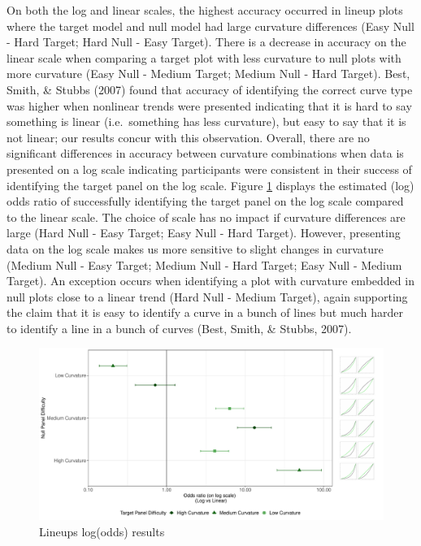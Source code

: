 \documentclass[print]{nuthesis}
\begin{document}
On both the log and linear scales, the highest accuracy occurred in lineup plots where the target model and null model had large curvature differences (Easy Null - Hard Target; Hard Null - Easy Target).
There is a decrease in accuracy on the linear scale when comparing a target plot with less curvature to null plots with more curvature (Easy Null - Medium Target; Medium Null - Hard Target).
Best, Smith, \& Stubbs (2007) found that accuracy of identifying the correct curve type was higher when nonlinear trends were presented indicating that it is hard to say something is linear (i.e.~something has less curvature), but easy to say that it is not linear; our results concur with this observation.
Overall, there are no significant differences in accuracy between curvature combinations when data is presented on a log scale indicating participants were consistent in their success of identifying the target panel on the log scale.
Figure \ref{fig:odds-ratio-plot} displays the estimated (log) odds ratio of successfully identifying the target panel on the log scale compared to the linear scale.
The choice of scale has no impact if curvature differences are large (Hard Null - Easy Target; Easy Null - Hard Target).
However, presenting data on the log scale makes us more sensitive to slight changes in curvature (Medium Null - Easy Target; Medium Null - Hard Target; Easy Null - Medium Target).
An exception occurs when identifying a plot with curvature embedded in null plots close to a linear trend (Hard Null - Medium Target), again supporting the claim that it is easy to identify a curve in a bunch of lines but much harder to identify a line in a bunch of curves (Best, Smith, \& Stubbs, 2007).

\begin{figure}

{\centering \includegraphics[width=\linewidth]{thesis_files/figure-latex/odds-ratio-plot-1} 

}

\caption{Lineups log(odds) results}\label{fig:odds-ratio-plot}
\end{figure}
\end{document}

